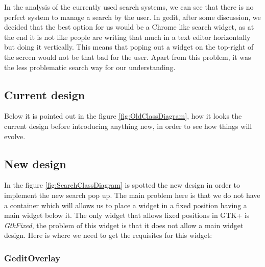 
In the analysis of the currently used search systems, we can see that there is no perfect system to manage a search by the user. In gedit, after some discussion, we decided that the best option for us would be a Chrome like search widget, as at the end it is not like people are writing that much in a text editor horizontally but doing it vertically. This means that poping out a widget on the top-right of the screen would not be that bad for the user. Apart from this problem, it was the less problematic search way for our understanding.

\subsection{Current design}

Below it is pointed out in the figure \ref{fig:OldClassDiagram}, how it looks the current design before introducing anything new, in order to see how things will evolve.


\subsection{New design}

In the figure \ref{fig:SearchClassDiagram} is spotted the new design in order to implement the new search pop up. The main problem here is that we do not have a container which will allows us to place a widget in a fixed position having a main widget below it. The only widget that allows fixed positions in GTK+ is \emph{GtkFixed}, the problem of this widget is that it does not allow a main widget design. Here is where we need to get the requisites for this widget:

\subsubsection{GeditOverlay}

